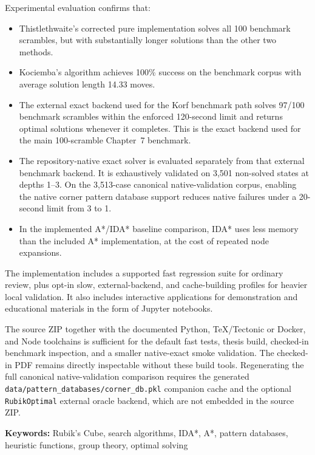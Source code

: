 Experimental evaluation confirms that:
\begin{itemize}
    \item Thistlethwaite's corrected pure implementation solves all 100 benchmark scrambles, but with substantially longer solutions than the other two methods.
    \item Kociemba's algorithm achieves 100\% success on the benchmark corpus with average solution length 14.33 moves.
    \item The external exact backend used for the Korf benchmark path solves 97/100 benchmark scrambles within the enforced 120-second limit and returns optimal solutions whenever it completes. This is the exact backend used for the main 100-scramble Chapter~7 benchmark.
    \item The repository-native exact solver is evaluated separately from that external benchmark backend. It is exhaustively validated on 3,501 non-solved states at depths 1--3. On the 3,513-case canonical native-validation corpus, enabling the native corner pattern database support reduces native failures under a 20-second limit from 3 to 1.
    \item In the implemented A*/IDA* baseline comparison, IDA* uses less memory than the included A* implementation, at the cost of repeated node expansions.
\end{itemize}

The implementation includes a supported fast regression suite for ordinary
review, plus opt-in slow, external-backend, and cache-building profiles for
heavier local validation. It also includes interactive applications for
demonstration and educational materials in the form of Jupyter notebooks.

The source ZIP together with the documented Python, TeX/Tectonic or Docker,
and Node toolchains is sufficient for the default fast tests, thesis build,
checked-in benchmark inspection, and a smaller native-exact smoke validation.
The checked-in PDF remains directly inspectable without these build tools.
Regenerating the full canonical native-validation comparison requires the
generated \texttt{data/pattern\_databases/corner\_db.pkl} companion cache and
the optional \texttt{RubikOptimal} external oracle backend, which are not
embedded in the source ZIP.

\vspace{1cm}
\noindent\textbf{Keywords:} Rubik's Cube, search algorithms, IDA*, A*, pattern databases, heuristic functions, group theory, optimal solving
